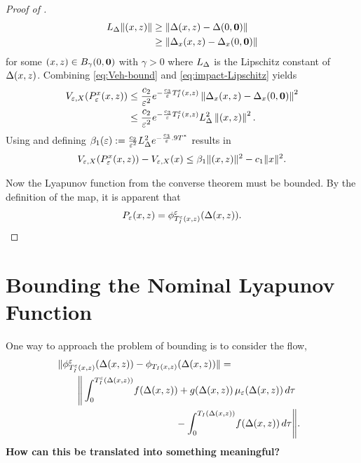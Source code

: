 \documentclass[twocolumn]{article}
\begin{document}
\begin{proof} [Proof of ]
  \begin{align}
    \label{eq:impact-Lipschitz}
    L_{\Delta} \| (x, z) \| &\geq \| \Delta(x, z) - \Delta(0, {\mathbf 0}) \|\\
    \nonumber
    &\geq \| \Delta_{x}(x, z) - \Delta_{x}(0, {\mathbf 0}) \|
  \end{align}
  for some $(x, z) \in B_{\gamma}(0, {\mathbf 0})$ with $\gamma > 0$ where $L_{\Delta}$ is the Lipschitz constant of $\Delta(x, z)$.
  Combining \eqref{eq:Veh-bound} and \eqref{eq:impact-Lipschitz} yields
  \begin{align}
    \nonumber
    V_{\varepsilon, X}(P_{\varepsilon}^{x}(x, z)) &\leq \frac{c_{2}}{\varepsilon^{2}} e^{-\frac{c_{3}}{\varepsilon} T_{I}^{\varepsilon}(x, z)} \left\| \Delta_{x}(x, z) - \Delta_{x}(0, {\mathbf 0}) \right\|^{2}\\
    &\leq \frac{c_{2}}{\varepsilon^{2}} e^{-\frac{c_{3}}{\varepsilon} T_{I}^{\varepsilon}(x, z)} L_{\Delta}^{2} \left\| (x, z) \right\|^{2}.
  \end{align}
  Using  and defining $\beta_{1}(\varepsilon) := \frac{c_{2}}{\varepsilon^{2}} L_{\Delta}^{2} e^{-\frac{c_{3}}{\varepsilon} .9 T^{*}}$ results in
  \begin{align}
    V_{\varepsilon, X}(P_{\varepsilon}^{x}(x, z)) - V_{\varepsilon, X}(x) \leq \beta_{1} \| (x, z) \|^{2} - c_{1} \| x \|^{2}.
  \end{align}

  Now the Lyapunov function from the converse theorem must be bounded.
  By the definition of the \Poincare{} map, it is apparent that
  \begin{align}
    P_{\varepsilon}(x, z) = \phi^{\varepsilon}_{T_{I}^{\varepsilon}(x, z)}(\Delta(x, z)).
  \end{align}
\end{proof}

\newpage

\section{Bounding the Nominal Lyapunov Function}
One way to approach the problem of bounding is to consider the flow,
\begin{align}\
  \lefteqn{\| \floweps_{\TIe(\zdx,\zdz)}(\Delta\argsxz) - \flow_{\TI(\zdx,\zdz)}(\Delta\argsxz) \| =}\\
  \nonumber
  & \hspace{2em} \Bigg\| \int_{0}^{\TIe(\Delta\argsxz)} \! f(\Delta\argsxz) + g(\Delta\argsxz) \, \mueps(\Delta\argsxz) \, d\tau\\ 
\nonumber
  & \hspace{12em} \mbox{} - \int_{0}^{\TI(\Delta\argsxz)} \! f(\Delta\argsxz) \, d\tau \Bigg\|.
\end{align}
{\bf How can this be translated into something meaningful?}
\end{document}
